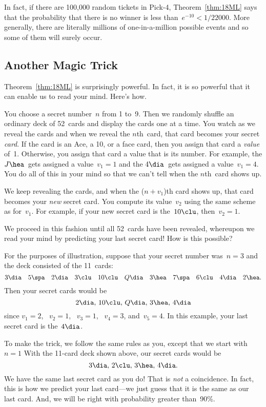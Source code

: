 In fact, if there are 100,000 random tickets in Pick-4,
Theorem~\ref{thm:18ML} says that the probability that there is no
winner is less than~$e^{-10} < 1/22000$.  More generally, there are
literally millions of one-in-a-million possible events and so some of
them will surely occur.

\subsection{Another Magic Trick}

Theorem~\ref{thm:18ML} is surprisingly powerful.  In fact, it is so
powerful that it can enable us to read your mind.  Here's how.

You choose a secret number~$n$ from 1 to~9.  Then we randomly shuffle
an ordinary deck of 52~cards and display the cards one at a time.  You
watch as we reveal the cards and when we reveal the $n$th~card, that
card becomes your secret \emph{card}.  If the card is an Ace, a 10, or
a face card, then you assign that card a \emph{value} of~1.
Otherwise, you assign that card a value that is its number.  For
example, the $J\hea$~gets assigned a value~$v_1 = 1$ and the $4
\dia$~gets assigned a value~$v_1 = 4$. You do all of this in your mind
so that we can't tell when the $n$th~card shows up.

We keep revealing the cards, and when the ($n + v_1$)th card shows up,
that card becomes your \emph{new} secret card.  You compute its
value~$v_2$ using the same scheme as for~$v_1$.  For example, if your
new secret card is the~$10 \clu$, then~$v_2 = 1$.

We proceed in this fashion until all 52~cards have been revealed,
whereupon we read your mind by predicting your last secret card!  How
is this possible?

For the purposes of illustration, suppose that your secret number
was~$n = 3$ and the deck consisted of the 11~cards:
\begin{equation*}
    3\dia \quad 5\spa \quad 2\dia \quad 3\clu \quad 10\clu
    \quad Q\dia \quad 3\hea \quad 7\spa \quad 6\clu
    \quad 4\dia \quad 2\hea.
\end{equation*}
Then your secret cards would be
\begin{equation*}
    2\dia, \, 10\clu, \, Q\dia, \, 3\hea, \, 4\dia
\end{equation*}
since $v_1 = 2$, \ $v_2 = 1$, \ $v_3 = 1$, \ $v_4 = 3$, and~$v_5 =
4$.  In this example, your last secret card is the~$4\dia$.

To make the trick, we follow the same rules as you, except that we
start with~$n = 1$  With the 11-card deck shown above, our secret
cards would be
\begin{equation*}
    3\dia, \, 2\clu, \, 3\hea, \, 4\dia.
\end{equation*}
We have the same last secret card as you do!  That is \emph{not} a
coincidence.  In fact, this is how we predict your last card---we just
guess that it is the same as our last card.  And, we will be right
with probability greater than~90\%.

